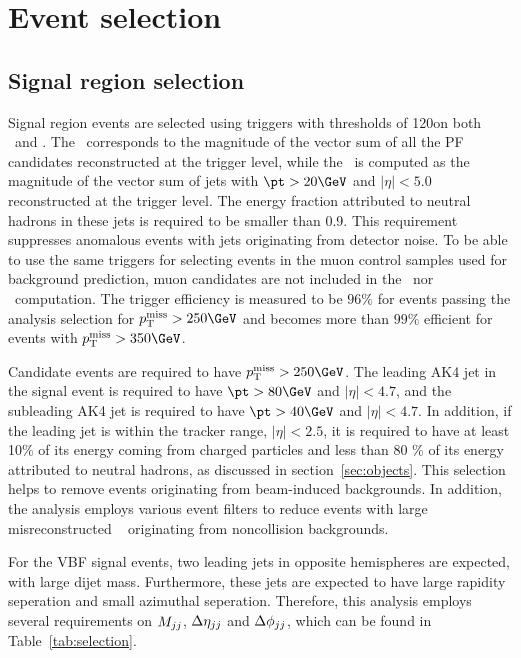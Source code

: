 \section{Event selection}
\label{sec:selection}

\subsection{Signal region selection}
\label{sec:selection_sr}
Signal region events are selected using triggers with thresholds of 120\GeV on both \ptmisstrig~and \mhttrig.
The \ptmisstrig~corresponds to the magnitude of the vector \ptvec sum of all the PF candidates reconstructed at the trigger level, 
while the \mhttrig~is computed as the magnitude of the vector \ptvec sum of jets with $\pt > 20\GeV$ and $|\eta| < 5.0$ reconstructed 
at the trigger level. The energy fraction attributed to neutral hadrons in these jets is required to be smaller than 0.9. 
This requirement suppresses anomalous events with jets originating from detector noise. 
To be able to use the same triggers for selecting events in the muon control samples used for background prediction, muon candidates are not included in the \ptmisstrig~nor \mhttrig~computation. 
The trigger efficiency is measured to be $96\%$ for events passing the analysis selection for $\ptmiss > 250\GeV$ and becomes more than $99\%$ efficient for events with $\ptmiss > 350\GeV$.

Candidate events are required to have $\ptmiss > 250\GeV$. 
The leading AK4 jet in the signal event is required to have $ \pt > 80\GeV $ and $|\eta| < 4.7$, and the subleading AK4 jet is 
required to have $ \pt > 40\GeV$ and $|\eta| < 4.7$. In addition, if the leading jet is within the tracker range, $|\eta| < 2.5$,
it is required to have at least 10\% of its energy coming from charged particles and less than 80 \% of its energy attributed to 
neutral hadrons, as discussed in section~\ref{sec:objects}. This selection helps to remove events originating from beam-induced backgrounds. 
In addition, the analysis employs various event filters to reduce events with large misreconstructed \ptmiss~\cite{Sirunyan:2019kia} originating from noncollision backgrounds.

For the VBF signal events, two leading jets in opposite hemispheres are expected, with large dijet mass. Furthermore, these jets are 
expected to have large rapidity seperation and small azimuthal seperation. Therefore, this analysis employs several requirements on 
$M_{jj}$, $\Delta \eta_{jj}$ and $\Delta \phi_{jj}$, which can be found in Table~\ref{tab:selection}.

